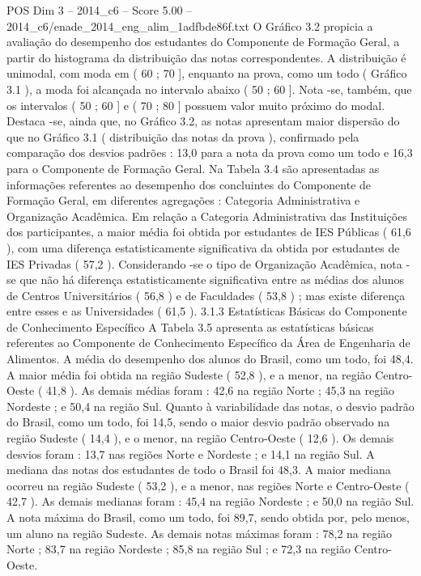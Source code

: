 \begin{textsample}{POS Dim 3 – 2014\_c6 – Score 5.00 – 2014\_c6/enade\_2014\_eng\_alim\_1adfbde86f.txt}
O Gráfico 3.2 propicia a avaliação do desempenho dos estudantes do Componente de Formação Geral, a partir do histograma da distribuição das notas correspondentes.
A distribuição é unimodal, com moda em ( 60 ; 70 ], enquanto na prova, como um todo ( Gráfico 3.1 ), a moda foi alcançada no intervalo abaixo ( 50 ; 60 ].
Nota -se, também, que os intervalos ( 50 ; 60 ] e ( 70 ; 80 ] possuem valor muito próximo do modal.
Destaca -se, ainda que, no Gráfico 3.2, as notas apresentam maior dispersão do que no Gráfico 3.1 ( distribuição das notas da prova ), confirmado pela comparação dos desvios padrões : 13,0 para a nota da prova como um todo e 16,3 para o Componente de Formação Geral.
Na Tabela 3.4 são apresentadas as informações referentes ao desempenho dos concluintes do Componente de Formação Geral, em diferentes agregações : Categoria Administrativa e Organização Acadêmica.
Em relação a Categoria Administrativa das Instituições dos participantes, a maior média foi obtida por estudantes de IES Públicas ( 61,6 ), com uma diferença estatisticamente significativa da obtida por estudantes de IES Privadas ( 57,2 ).
Considerando -se o tipo de Organização Acadêmica, nota -se que não há diferença estatisticamente significativa entre as médias dos alunos de Centros Universitários ( 56,8 ) e de Faculdades ( 53,8 ) ; mas existe diferença entre esses e as Universidades ( 61,5 ). 3.1.3 Estatísticas Básicas do Componente de Conhecimento Específico A Tabela 3.5 apresenta as estatísticas básicas referentes ao Componente de Conhecimento Específico da Área de Engenharia de Alimentos.
A média do desempenho dos alunos do Brasil, como um todo, foi 48,4.
A maior média foi obtida na região Sudeste ( 52,8 ), e a menor, na região Centro-Oeste ( 41,8 ).
As demais médias foram : 42,6 na região Norte ; 45,3 na região Nordeste ; e 50,4 na região Sul.
Quanto à variabilidade das notas, o desvio padrão do Brasil, como um todo, foi 14,5, sendo o maior desvio padrão observado na região Sudeste ( 14,4 ), e o menor, na região Centro-Oeste ( 12,6 ).
Os demais desvios foram : 13,7 nas regiões Norte e Nordeste ; e 14,1 na região Sul.
A mediana das notas dos estudantes de todo o Brasil foi 48,3.
A maior mediana ocorreu na região Sudeste ( 53,2 ), e a menor, nas regiões Norte e Centro-Oeste ( 42,7 ).
As demais medianas foram : 45,4 na região Nordeste ; e 50,0 na região Sul.
A nota máxima do Brasil, como um todo, foi 89,7, sendo obtida por, pelo menos, um aluno na região Sudeste.
As demais notas máximas foram : 78,2 na região Norte ; 83,7 na região Nordeste ; 85,8 na região Sul ; e 72,3 na região Centro-Oeste.

\end{textsample}
